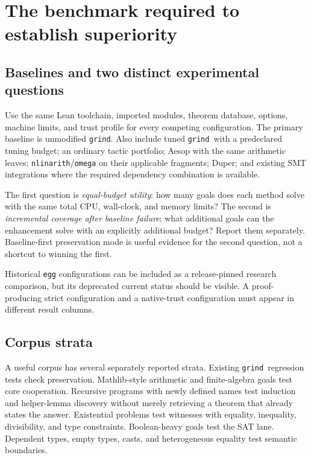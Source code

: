 \documentclass[11pt,a4paper]{article}
\newcommand{\grind}{\texttt{grind}}
\begin{document}
\section{The benchmark required to establish superiority}
\label{sec:benchmark}

\subsection{Baselines and two distinct experimental questions}

Use the same Lean toolchain, imported modules, theorem database, options, machine limits, and trust profile for every competing configuration. The primary baseline is unmodified \grind. Also include tuned \grind\ with a predeclared tuning budget; an ordinary tactic portfolio; Aesop with the same arithmetic leaves; \texttt{nlinarith}/\texttt{omega} on their applicable fragments; Duper; and existing SMT integrations where the required dependency combination is available.

The first question is \emph{equal-budget utility}: how many goals does each method solve with the same total CPU, wall-clock, and memory limits? The second is \emph{incremental coverage after baseline failure}: what additional goals can the enhancement solve with an explicitly additional budget? Report them separately. Baseline-first preservation mode is useful evidence for the second question, not a shortcut to winning the first.

Historical \texttt{egg} configurations can be included as a release-pinned research comparison, but its deprecated current status should be visible. A proof-producing strict configuration and a native-trust configuration must appear in different result columns.

\subsection{Corpus strata}

A useful corpus has several separately reported strata. Existing \grind\ regression tests check preservation. Mathlib-style arithmetic and finite-algebra goals test core cooperation. Recursive programs with newly defined names test induction and helper-lemma discovery without merely retrieving a theorem that already states the answer. Existential problems test witnesses with equality, inequality, divisibility, and type constraints. Boolean-heavy goals test the SAT lane. Dependent types, empty types, casts, and heterogeneous equality test semantic boundaries.
\end{document}
